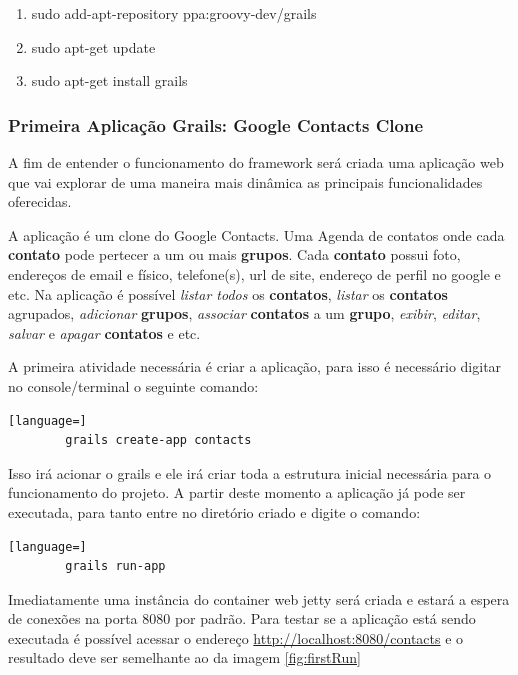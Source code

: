 \documentclass[12pt]{article}
\begin{document}
    \begin{enumerate}
        \item sudo add-apt-repository ppa:groovy-dev/grails
        \item sudo apt-get update
        \item sudo apt-get install grails
    \end{enumerate}

\subsubsection{Primeira Aplicação Grails: Google Contacts Clone}

    A fim de entender o funcionamento do framework será criada uma aplicação web
    que vai explorar de uma maneira mais dinâmica as principais funcionalidades
    oferecidas.
    
    A aplicação é um clone do Google Contacts. Uma Agenda de contatos onde cada 
    \textbf{contato} pode pertecer a um ou mais \textbf{grupos}. Cada \textbf{contato}
    possui foto, endereços de email e físico, telefone(s), url de site, endereço 
    de perfil no google e etc. Na aplicação é possível \emph{listar todos} os 
    \textbf{contatos}, \emph{listar} os \textbf{contatos} agrupados, 
    \emph{adicionar} \textbf{grupos}, \emph{associar} \textbf{contatos} a um \textbf{grupo},
    \emph{exibir}, \emph{editar}, \emph{salvar} e \emph{apagar} \textbf{contatos} e etc.
    
    A primeira atividade necessária é criar a aplicação, para isso é necessário
    digitar no console/terminal o seguinte comando:
    
    \begin{lstlisting}[language=]
        grails create-app contacts
    \end{lstlisting}
    
    Isso irá acionar o grails e ele irá criar toda a estrutura inicial necessária para
    o funcionamento do projeto. A partir deste momento a aplicação já pode ser 
    executada, para tanto entre no diretório criado e digite o comando:
    
    \begin{lstlisting}[language=]
        grails run-app
    \end{lstlisting}
    
    Imediatamente uma instância do container web jetty será criada e estará a
    espera de conexões na porta 8080 por padrão. Para testar se a aplicação está
    sendo executada é possível acessar o endereço \url{http://localhost:8080/contacts} 
    e o resultado deve ser semelhante ao da imagem \ref{fig:firstRun}
    
\end{document}
